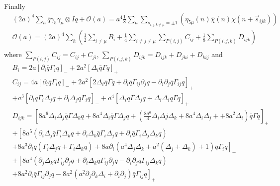 Finally
\textcolor[rgb]{0,0,1}{
\begin{equation}
\begin{split}
&(2a)^4\sum _h \bar{q}\gamma _5\gamma _{\mu}\otimes I q + \mathcal{O}(a) = a^4 \frac{1}{8}\sum _n \sum _{s_{i,j,k\neq \mu }=\pm 1}\left(\eta _{5\mu}(n)\bar{\chi}(n)\chi(n+\vec{s}_{ijk})\right)\\
&\mathcal{O}(a) =(2a)^4\sum _h \left(\frac{1}{2}\sum _{i\neq \mu}B_i+\frac{1}{4}\sum _{i\neq j\neq \mu}\sum _{P(i,j)}C_{ij}+\frac{1}{8}\sum _{P(i,j,k)}D_{ijk}\right)\\
\end{split}
\end{equation} 
where $\sum _{P(i,j)}C_{ij}=C_{ij}+C_{ji}$, $\sum _{P(i,j,k)}D_{ijk}=D_{ijk}+D_{jki}+D_{kij}$ and
\begin{equation}
\begin{split}
&B_i=2a\left[\partial _i\bar{q}\Gamma _i q\right]_- +2a^2\left[\Delta _i \bar{q}\Gamma  q\right]_+\\
&C_{ij}=4a\left[\partial _i\bar{q}\Gamma _i q\right]_-+2a^2\left[2\Delta _i \bar{q}\Gamma  q +\partial _i \bar{q}\Gamma _{ij}\partial _j q -\partial _i\partial _j \bar{q}\Gamma _{ij}q\right]_+\\
&+a^3\left[\partial _i \bar{q}\Gamma _i \Delta _j q +\partial _i\Delta _j \bar{q}\Gamma _i q\right]_-+a^4\left[\Delta _i \bar{q}\Gamma\Delta _j q+\Delta _i\Delta _i \bar{q}\Gamma  q\right]_+\\
&D_{ijk}=\left[8a^6 \Delta _i\Delta _j \bar{q}\Gamma \Delta _k q +8a^4 \Delta _i \bar{q}\Gamma \Delta _j q +\left(\frac{8a^6}{3}\Delta _i\Delta j\Delta _k +8a^4\Delta _i\Delta _j + +8a^2 \Delta _i\right)\bar{q}\Gamma q\right]_+\\
&+\left[8a^5\left(\partial _i\Delta _j \bar{q}\Gamma _i \Delta _k q+ \partial _i \Delta _k \bar{q}\Gamma _i \Delta _j q + \partial _i \bar{q}\Gamma _i \Delta _j\Delta _k q\right)\right.\\
&\left. +8a^3\partial _i \bar{q}\left(\Gamma _i\Delta _j q+\Gamma _i \Delta _k q\right)+8a\partial _i \left(a^4\Delta _j\Delta _k + a^2(\Delta_j+\Delta _k)+1\right)\bar{q}\Gamma _i q\right]_-\\
&+\left[8a^4\left(\partial _j\Delta _k \bar{q}\Gamma _{ij}\partial _j q + \partial _i\Delta _k \bar{q}\Gamma _{ij}\partial _j q - \partial _i \partial _j \bar{q}\Gamma _{ij}\Delta _k q\right)\right.\\
&\left.+8a^2\partial _i\bar{q}\Gamma _{ij}\partial _j q - 8 a^2 \left(a^2\partial _j\partial _k\Delta _i + \partial _i\partial _j\right)\bar{q}\Gamma _{ij}q\right]_+ 

\end{split}
\end{equation}}
